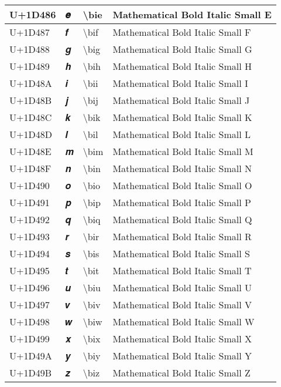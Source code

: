 \begin{table}[h]
\begin{tabulary}{\linewidth}{|L|L|L|L|}
\hline
U+1D486 & 𝒆 & {\textbackslash}bie & Mathematical Bold Italic Small E \\
\hline
U+1D487 & 𝒇 & {\textbackslash}bif & Mathematical Bold Italic Small F \\
\hline
U+1D488 & 𝒈 & {\textbackslash}big & Mathematical Bold Italic Small G \\
\hline
U+1D489 & 𝒉 & {\textbackslash}bih & Mathematical Bold Italic Small H \\
\hline
U+1D48A & 𝒊 & {\textbackslash}bii & Mathematical Bold Italic Small I \\
\hline
U+1D48B & 𝒋 & {\textbackslash}bij & Mathematical Bold Italic Small J \\
\hline
U+1D48C & 𝒌 & {\textbackslash}bik & Mathematical Bold Italic Small K \\
\hline
U+1D48D & 𝒍 & {\textbackslash}bil & Mathematical Bold Italic Small L \\
\hline
U+1D48E & 𝒎 & {\textbackslash}bim & Mathematical Bold Italic Small M \\
\hline
U+1D48F & 𝒏 & {\textbackslash}bin & Mathematical Bold Italic Small N \\
\hline
U+1D490 & 𝒐 & {\textbackslash}bio & Mathematical Bold Italic Small O \\
\hline
U+1D491 & 𝒑 & {\textbackslash}bip & Mathematical Bold Italic Small P \\
\hline
U+1D492 & 𝒒 & {\textbackslash}biq & Mathematical Bold Italic Small Q \\
\hline
U+1D493 & 𝒓 & {\textbackslash}bir & Mathematical Bold Italic Small R \\
\hline
U+1D494 & 𝒔 & {\textbackslash}bis & Mathematical Bold Italic Small S \\
\hline
U+1D495 & 𝒕 & {\textbackslash}bit & Mathematical Bold Italic Small T \\
\hline
U+1D496 & 𝒖 & {\textbackslash}biu & Mathematical Bold Italic Small U \\
\hline
U+1D497 & 𝒗 & {\textbackslash}biv & Mathematical Bold Italic Small V \\
\hline
U+1D498 & 𝒘 & {\textbackslash}biw & Mathematical Bold Italic Small W \\
\hline
U+1D499 & 𝒙 & {\textbackslash}bix & Mathematical Bold Italic Small X \\
\hline
U+1D49A & 𝒚 & {\textbackslash}biy & Mathematical Bold Italic Small Y \\
\hline
U+1D49B & 𝒛 & {\textbackslash}biz & Mathematical Bold Italic Small Z \\

\end{tabulary}
\end{table}
